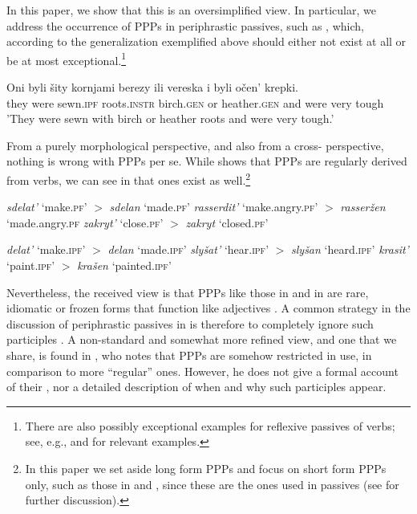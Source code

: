 \documentclass[output=paper,modfonts,newtxmath,hidelinks]{langscibook}
\begin{document}
\noindent In this paper, we show that this is an oversimplified view. In particular, we address the occurrence of  PPPs in  periphrastic passives, such as , which, according to the generalization exemplified above should either not exist at all or be at most exceptional.\footnote{There are also possibly exceptional examples for reflexive passives of  verbs; see, e.g., \citet{schoorlemmer95} and \citet{fehrmann+10} for relevant examples.} 

\ea\gll Oni byli šity kornjami berezy ili vereska i byli očen' krepki.\\
	they were sewn.\textsc{ipf} roots.\textsc{instr} birch.\textsc{gen} or heather.\textsc{gen} and were very tough\\
\glt	'They were sewn with birch or heather roots and were very tough.' \label{sity}
\z

\noindent From a purely morphological perspective, and also from a cross- perspective, nothing is wrong with  PPPs per se. While  shows that PPPs are regularly derived from  verbs, we can see in  that  ones exist as well.\footnote{In this paper we set aside long form PPPs and focus on short form PPPs only, such as those in  and , since these are the ones used in passives (see \citealt{borik14} for further discussion).}

\ea\label{pfppp}
\ea \textit{sdelat'} `make.\textsc{pf}' $>$ \textit{sdelan} `made.\textsc{pf}'
\ex \textit{rasserdit'} `make.angry.\textsc{pf}'  $>$ \textit{rasseržen}  `made.angry.\textsc{pf}
\ex \textit{zakryt'} `close.\textsc{pf}' $>$ \textit{zakryt} `closed.\textsc{pf}'
\z\z

\ea\label{ipfppp}
\ea \textit{delat'} `make.\textsc{ipf}' $>$ \textit{delan} `made.\textsc{ipf}'
\ex \textit{slyšat'} `hear.\textsc{ipf}' $>$ \textit{slyšan} `heard.\textsc{ipf}'
\ex \textit{krasit'} `paint.\textsc{ipf}' $>$ \textit{krašen} `painted.\textsc{ipf}'
\z\z

\noindent Nevertheless, the received view is that  PPPs like those in  and in  are rare, idiomatic or frozen forms that function like adjectives \citep[e.g.][]{svedova80, schoorlemmer95}.  A common strategy in the discussion of periphrastic passives in  is therefore to completely ignore such participles \citep{babbybrecht75, paslawskastechow}. A non-standard and somewhat more refined view, and one that we share, is found in \citet{knjazev07}, who notes that  PPPs are somehow restricted in use, in comparison to more ``regular''  ones. However, he does not give a formal account of their , nor a detailed description of when and why such participles appear.
\end{document}
